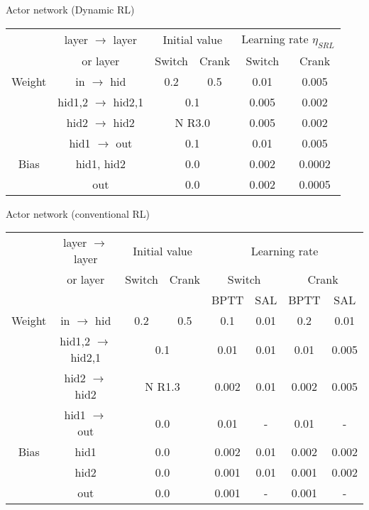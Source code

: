 \begin{table}[h]
  \vspace{5mm}
  Actor network (Dynamic RL)\\
  \vspace{3mm}
  \centering \small
  \begin{tabular}{cccccc}
  \hline
                      &   layer $\rightarrow$ layer  & \multicolumn{2}{c}{Initial value} & \multicolumn{2}{c}{Learning rate $\eta_{SRL}$}\\
                       &  or layer                             & Switch & Crank & Switch & Crank\\                       
  \hline                     
  Weight & in $\rightarrow$ hid & 0.2 & 0.5 & 0.01 & 0.005\\
                       & hid1,2 $\rightarrow$ hid2,1 & \multicolumn{2}{c}{0.1} & 0.005 & 0.002\\
                       & hid2 $\rightarrow$ hid2 & \multicolumn{2}{c}{N R3.0} & 0.005 & 0.002\\
                       & hid1 $\rightarrow$ out & \multicolumn{2}{c}{0.1} & 0.01 & 0.005\\
  \hline
  Bias& hid1, hid2 & \multicolumn{2}{c}{0.0} & 0.002 & 0.0002\\
         & out  & \multicolumn{2}{c}{0.0} & 0.002 & 0.0005\\
  \hline
  \end{tabular}
  
  \vspace{5mm}
  Actor network (conventional RL)\\
  \vspace{3mm}
  \centering \small
  \begin{tabular}{cccccccc}
  \hline
                      &   layer $\rightarrow$ layer & \multicolumn{2}{c}{Initial value} & \multicolumn{4}{c}{Learning rate}\\
                       &  or layer                           & Switch & Crank & \multicolumn{2}{c}{Switch} & \multicolumn{2}{c}{Crank}\\                       
                       &                                         &         &        &  BPTT& SAL  & BPTT& SAL\\                       
  \hline                     
  Weight & in $\rightarrow$ hid & 0.2 & 0.5 & 0.1 & 0.01 & 0.2 & 0.01\\
                       & hid1,2 $\rightarrow$ hid2,1 & \multicolumn{2}{c}{0.1} & 0.01 & 0.01 & 0.01 & 0.005\\
                       & hid2 $\rightarrow$ hid2 & \multicolumn{2}{c}{N R1.3} & 0.002 & 0.01 & 0.002 & 0.005\\
                       & hid1 $\rightarrow$ out & \multicolumn{2}{c}{0.0} & 0.01 & - & 0.01 & -\\
  \hline
  Bias& hid1 & \multicolumn{2}{c}{0.0} & 0.002 & 0.01 & 0.002 & 0.002\\
         & hid2 & \multicolumn{2}{c}{0.0} & 0.001 & 0.01 & 0.001 & 0.002\\
         & out  & \multicolumn{2}{c}{0.0} & 0.001 & - & 0.001 & -\\
  \hline
  \end{tabular}
\end{table}
